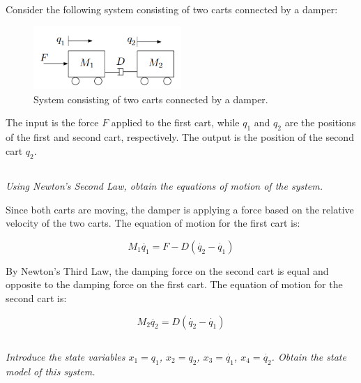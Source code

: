 \section{}
Consider the following system consisting of two carts connected by a damper:
\begin{figure}[h]
    \centering
    \includegraphics[width=0.5\textwidth]{Questions/Figures/Q2ProblemDiagram.png}
    \caption{System consisting of two carts connected by a damper.}
    \label{fig:Q2 System}
\end{figure}

The input is the force $F$ applied to the first cart, while $q_1$ and $q_2$ are the positions of the first and second cart, 
respectively. The output is the position of the second cart $q_2$.

\subsection{}
\textit{Using Newton’s Second Law, obtain the equations of motion of the system.}


Since both carts are moving, the damper is applying a force based on the relative velocity of the two carts. The equation of motion for the first cart is:

\begin{equation}
    \boxed{M_1\ddot{q_1} = F - D(\dot{q_2} - \dot{q_1})} \nonumber
\end{equation}

By Newton's Third Law, the damping force on the second cart is equal and opposite to the damping force on the first cart. The equation of motion for the second cart is:

\begin{equation}
    \boxed{M_2\ddot{q_2} = D(\dot{q_2} - \dot{q_1})} \nonumber
\end{equation}

\subsection{}
\textit{Introduce the state variables $x_1 = q_1$, $x_2 = q_2$, $x_3 = \dot{q_1}$, $x_4 = \dot{q_2}$. Obtain the state model of this system.}

